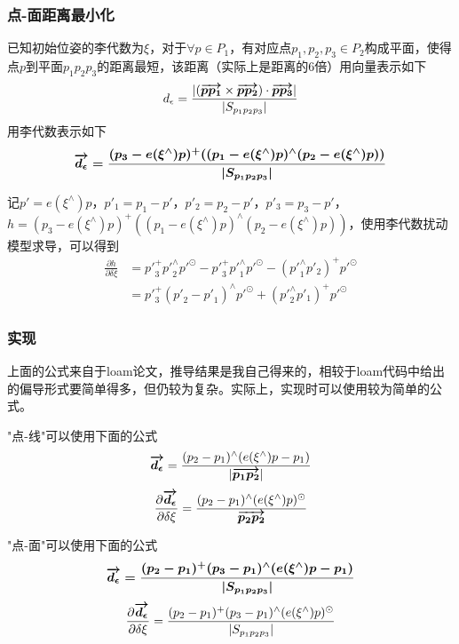\documentclass{ctexart}
\begin{document}
{	\subsubsection{点-面距离最小化}
	已知初始位姿的李代数为$\xi$，对于$\forall p \in P_1$，有对应点$p_1,p_2,p_3 \in P_2$构成平面，使得点$p$到平面$p_1p_2p_3$的距离最短，该距离（实际上是距离的6倍）用向量表示如下
	\begin{equation}
	d_{\epsilon} =
	\frac{|(\boldmath\overrightarrow{p p_1}\unboldmath \times \boldmath\overrightarrow{p p_2}\unboldmath) \cdot \boldmath\overrightarrow{p p_3}\unboldmath|}{|S_{p_1 p_2 p_3}|}
	\end{equation}
	用李代数表示如下
	\begin{equation}
	\boldmath\overrightarrow{d_{\epsilon}}\unboldmath =
	\frac{(p_3-e(\xi ^\wedge)p)^{+}((p_1-e(\xi ^\wedge)p)^\wedge(p_2-e(\xi ^\wedge)p))}{|S_{p_1 p_2 p_3}|}
	\end{equation}
	\par 记$p'=e(\xi ^\wedge)p$，$p'_1=p_1-p'$，$p'_2=p_2-p'$，$p'_3=p_3-p'$，$h=(p_3-e(\xi ^\wedge)p)
	^{+}(
	(p_1-e(\xi ^\wedge)p) 
	^\wedge 
	(p_2-e(\xi ^\wedge)p))$，使用李代数扰动模型求导，可以得到
	\begin{equation}
	\begin{split}
	\frac{\partial h}{\partial \delta \xi}
	&=
	{p'}_3^{+} {p'}_2^\wedge p'^\odot -
	{p'}_3^{+} {p'}_1^\wedge p'^\odot -
	({p'}_1^\wedge p'_2)^{+} p'^\odot \\
	&=
	{p'}_3^{+} ({p'}_2-{p'}_1)^\wedge p'^\odot + ({p'}_2^\wedge p'_1)^{+} p'^\odot
	\end{split}
	\end{equation}
	
	\subsubsection{实现}
	上面的公式来自于loam论文，推导结果是我自己得来的，相较于loam代码中给出的偏导形式要简单得多，但仍较为复杂。实际上，实现时可以使用较为简单的公式。
	\par "点-线"可以使用下面的公式
	\begin{equation}
	\boldmath\overrightarrow{d_{\epsilon}}\unboldmath =
	\frac{(p_2-p_1)^\wedge(e(\xi ^\wedge)p-p_1)}{|\boldmath\overrightarrow{p_1 p_2}\unboldmath|}
	\end{equation}
	\begin{equation}
	\frac{\partial \boldmath\overrightarrow{d_{\epsilon}}\unboldmath}{\partial\delta\xi}
	=
	\frac{(p_2-p_1)^\wedge(e(\xi^\wedge)p)^\odot}{\boldmath\overrightarrow{p_2p_2}\unboldmath}
	\end{equation}
	
	\par "点-面"可以使用下面的公式
	\begin{equation}
	\boldmath\overrightarrow{d_{\epsilon}}\unboldmath =
	\frac{(p_2-p_1)^{+}(p_3-p_1)^\wedge(e(\xi ^\wedge)p-p_1)}{|S_{p_1 p_2 p_3}|}
	\end{equation}
	\begin{equation}
	\frac{\partial \boldmath\overrightarrow{d_{\epsilon}}\unboldmath}{\partial\delta\xi}
	=
	\frac{(p_2-p_1)^{+}(p_3-p_1)^\wedge(e(\xi ^\wedge)p)^\odot}{|S_{p_1 p_2 p_3}|}
	\end{equation}
	
}
\end{document}
